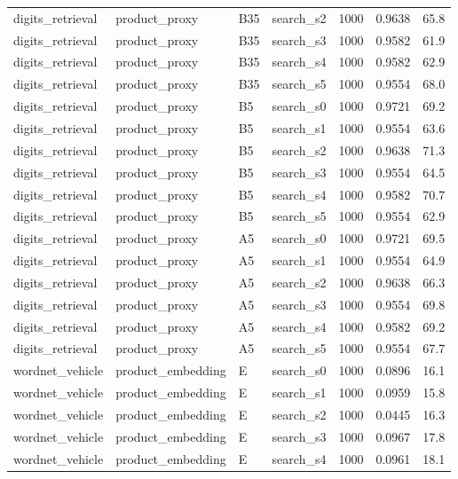 \begin{longtable}{llllrrr}
digits\_retrieval & product\_proxy & B35 & search\_s2 & 1000 & 0.9638 & 65.8 \\
digits\_retrieval & product\_proxy & B35 & search\_s3 & 1000 & 0.9582 & 61.9 \\
digits\_retrieval & product\_proxy & B35 & search\_s4 & 1000 & 0.9582 & 62.9 \\
digits\_retrieval & product\_proxy & B35 & search\_s5 & 1000 & 0.9554 & 68.0 \\
\rowcolor{oursbg}
digits\_retrieval & product\_proxy & B5 & search\_s0 & 1000 & 0.9721 & 69.2 \\
\rowcolor{oursbg}
digits\_retrieval & product\_proxy & B5 & search\_s1 & 1000 & 0.9554 & 63.6 \\
\rowcolor{oursbg}
digits\_retrieval & product\_proxy & B5 & search\_s2 & 1000 & 0.9638 & 71.3 \\
\rowcolor{oursbg}
digits\_retrieval & product\_proxy & B5 & search\_s3 & 1000 & 0.9554 & 64.5 \\
\rowcolor{oursbg}
digits\_retrieval & product\_proxy & B5 & search\_s4 & 1000 & 0.9582 & 70.7 \\
\rowcolor{oursbg}
digits\_retrieval & product\_proxy & B5 & search\_s5 & 1000 & 0.9554 & 62.9 \\
digits\_retrieval & product\_proxy & A5 & search\_s0 & 1000 & 0.9721 & 69.5 \\
digits\_retrieval & product\_proxy & A5 & search\_s1 & 1000 & 0.9554 & 64.9 \\
digits\_retrieval & product\_proxy & A5 & search\_s2 & 1000 & 0.9638 & 66.3 \\
digits\_retrieval & product\_proxy & A5 & search\_s3 & 1000 & 0.9554 & 69.8 \\
digits\_retrieval & product\_proxy & A5 & search\_s4 & 1000 & 0.9582 & 69.2 \\
digits\_retrieval & product\_proxy & A5 & search\_s5 & 1000 & 0.9554 & 67.7 \\
wordnet\_vehicle & product\_embedding & E & search\_s0 & 1000 & 0.0896 & 16.1 \\
wordnet\_vehicle & product\_embedding & E & search\_s1 & 1000 & 0.0959 & 15.8 \\
wordnet\_vehicle & product\_embedding & E & search\_s2 & 1000 & 0.0445 & 16.3 \\
wordnet\_vehicle & product\_embedding & E & search\_s3 & 1000 & 0.0967 & 17.8 \\
wordnet\_vehicle & product\_embedding & E & search\_s4 & 1000 & 0.0961 & 18.1 \\

\end{longtable}
